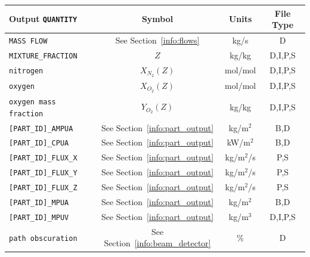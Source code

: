 \documentclass[11pt]{book}
\newcommand{\ct}{\tt\small}
\begin{document}
\begin{table}[h!]
\begin{center}
\begin{tabular}{|l|c|c|c|}
\hline
Output {\ct QUANTITY}                           & Symbol                                        & Units          & File Type    \\ \hline \hline
{\ct MASS FLOW}                                 & See Section~\ref{info:flows}                  & kg/s           & D            \\ \hline
{\ct MIXTURE\_FRACTION}                         & $Z$                                           & kg/kg          & D,I,P,S      \\ \hline
{\ct nitrogen}                                  & $X_{N_2}(Z)$                                  & mol/mol        & D,I,P,S      \\ \hline
{\ct oxygen}                                    & $X_{O_2}(Z)$                                  & mol/mol        & D,I,P,S      \\ \hline
{\ct oxygen mass fraction}                      & $Y_{O_2}(Z)$                                  & kg/kg          & D,I,P,S      \\ \hline
{\ct [PART\_ID]\_AMPUA}                         & See Section~\ref{info:part_output}            & kg/m$^2$       & B,D          \\ \hline
{\ct [PART\_ID]\_CPUA}                          & See Section~\ref{info:part_output}            & kW/m$^2$       & B,D          \\ \hline
{\ct [PART\_ID]\_FLUX\_X}                       & See Section~\ref{info:part_output}            & kg/m$^2$/s     & P,S          \\ \hline
{\ct [PART\_ID]\_FLUX\_Y}                       & See Section~\ref{info:part_output}            & kg/m$^2$/s     & P,S          \\ \hline
{\ct [PART\_ID]\_FLUX\_Z}                       & See Section~\ref{info:part_output}            & kg/m$^2$/s     & P,S          \\ \hline
{\ct [PART\_ID]\_MPUA}                          & See Section~\ref{info:part_output}            & kg/m$^2$       & B,D          \\ \hline
{\ct [PART\_ID]\_MPUV}                          & See Section~\ref{info:part_output}            & kg/m$^3$       & D,I,P,S      \\ \hline
{\ct path obscuration}                          & See Section~\ref{info:beam_detector}          & \%             & D            \\ \hline

\end{tabular}
\end{center}
\end{table}
\end{document}
